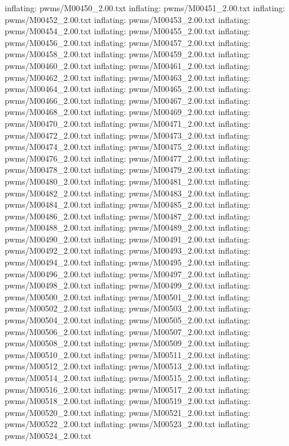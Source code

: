 \documentclass[letterpaper,10pt,english]{sphinxmanual}
\begin{document}
{\begin{sphinxVerbatim}[commandchars=\\\{\}]
  inflating: pwms/M00450\_2.00.txt
  inflating: pwms/M00451\_2.00.txt
  inflating: pwms/M00452\_2.00.txt
  inflating: pwms/M00453\_2.00.txt
  inflating: pwms/M00454\_2.00.txt
  inflating: pwms/M00455\_2.00.txt
  inflating: pwms/M00456\_2.00.txt
  inflating: pwms/M00457\_2.00.txt
  inflating: pwms/M00458\_2.00.txt
  inflating: pwms/M00459\_2.00.txt
  inflating: pwms/M00460\_2.00.txt
  inflating: pwms/M00461\_2.00.txt
  inflating: pwms/M00462\_2.00.txt
  inflating: pwms/M00463\_2.00.txt
  inflating: pwms/M00464\_2.00.txt
  inflating: pwms/M00465\_2.00.txt
  inflating: pwms/M00466\_2.00.txt
  inflating: pwms/M00467\_2.00.txt
  inflating: pwms/M00468\_2.00.txt
  inflating: pwms/M00469\_2.00.txt
  inflating: pwms/M00470\_2.00.txt
  inflating: pwms/M00471\_2.00.txt
  inflating: pwms/M00472\_2.00.txt
  inflating: pwms/M00473\_2.00.txt
  inflating: pwms/M00474\_2.00.txt
  inflating: pwms/M00475\_2.00.txt
  inflating: pwms/M00476\_2.00.txt
  inflating: pwms/M00477\_2.00.txt
  inflating: pwms/M00478\_2.00.txt
  inflating: pwms/M00479\_2.00.txt
  inflating: pwms/M00480\_2.00.txt
  inflating: pwms/M00481\_2.00.txt
  inflating: pwms/M00482\_2.00.txt
  inflating: pwms/M00483\_2.00.txt
  inflating: pwms/M00484\_2.00.txt
  inflating: pwms/M00485\_2.00.txt
  inflating: pwms/M00486\_2.00.txt
  inflating: pwms/M00487\_2.00.txt
  inflating: pwms/M00488\_2.00.txt
  inflating: pwms/M00489\_2.00.txt
  inflating: pwms/M00490\_2.00.txt
  inflating: pwms/M00491\_2.00.txt
  inflating: pwms/M00492\_2.00.txt
  inflating: pwms/M00493\_2.00.txt
  inflating: pwms/M00494\_2.00.txt
  inflating: pwms/M00495\_2.00.txt
  inflating: pwms/M00496\_2.00.txt
  inflating: pwms/M00497\_2.00.txt
  inflating: pwms/M00498\_2.00.txt
  inflating: pwms/M00499\_2.00.txt
  inflating: pwms/M00500\_2.00.txt
  inflating: pwms/M00501\_2.00.txt
  inflating: pwms/M00502\_2.00.txt
  inflating: pwms/M00503\_2.00.txt
  inflating: pwms/M00504\_2.00.txt
  inflating: pwms/M00505\_2.00.txt
  inflating: pwms/M00506\_2.00.txt
  inflating: pwms/M00507\_2.00.txt
  inflating: pwms/M00508\_2.00.txt
  inflating: pwms/M00509\_2.00.txt
  inflating: pwms/M00510\_2.00.txt
  inflating: pwms/M00511\_2.00.txt
  inflating: pwms/M00512\_2.00.txt
  inflating: pwms/M00513\_2.00.txt
  inflating: pwms/M00514\_2.00.txt
  inflating: pwms/M00515\_2.00.txt
  inflating: pwms/M00516\_2.00.txt
  inflating: pwms/M00517\_2.00.txt
  inflating: pwms/M00518\_2.00.txt
  inflating: pwms/M00519\_2.00.txt
  inflating: pwms/M00520\_2.00.txt
  inflating: pwms/M00521\_2.00.txt
  inflating: pwms/M00522\_2.00.txt
  inflating: pwms/M00523\_2.00.txt
  inflating: pwms/M00524\_2.00.txt

\end{sphinxVerbatim}}
\end{document}
